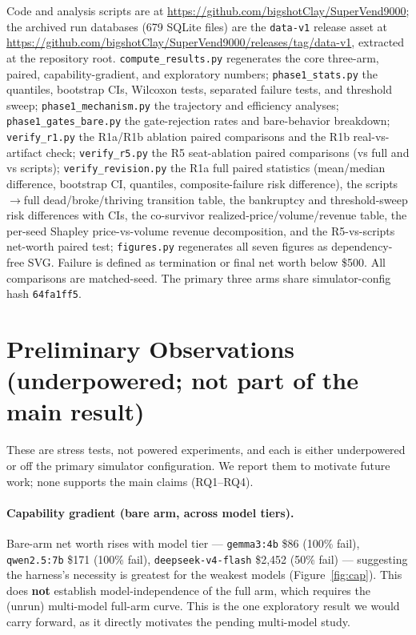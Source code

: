 \documentclass[11pt]{article}
\begin{document}
Code and analysis scripts are at
\url{https://github.com/bigshotClay/SuperVend9000}; the archived run databases
(679 SQLite files) are the \texttt{data-v1} release asset at
\url{https://github.com/bigshotClay/SuperVend9000/releases/tag/data-v1},
extracted at the repository root. \texttt{compute\_results.py} regenerates the core
three-arm, paired, capability-gradient, and exploratory numbers;
\texttt{phase1\_stats.py} the quantiles, bootstrap CIs, Wilcoxon tests,
separated failure tests, and threshold sweep; \texttt{phase1\_mechanism.py} the
trajectory and efficiency analyses; \texttt{phase1\_gates\_bare.py} the
gate-rejection rates and bare-behavior breakdown; \texttt{verify\_r1.py} the
R1a/R1b ablation paired comparisons and the R1b real-vs-artifact check;
\texttt{verify\_r5.py} the R5 seat-ablation paired comparisons (vs full and vs
scripts); \texttt{verify\_revision.py} the R1a full paired statistics
(mean/median difference, bootstrap CI, quantiles, composite-failure risk
difference), the scripts$\to$full dead/broke/thriving transition table, the
bankruptcy and threshold-sweep risk differences with CIs, the co-survivor
realized-price/volume/revenue table, the per-seed Shapley price-vs-volume
revenue decomposition, and the R5-vs-scripts net-worth paired test;
\texttt{figures.py} regenerates all seven figures as dependency-free SVG.
Failure is defined as termination or final net worth below \$500. All
comparisons are matched-seed. The primary three arms share simulator-config
hash \texttt{64fa1ff5}.

\section{Preliminary Observations (underpowered; not part of the main result)}

These are stress tests, not powered experiments, and each is either underpowered
or off the primary simulator configuration. We report them to motivate future
work; none supports the main claims (RQ1--RQ4).

\paragraph{Capability gradient (bare arm, across model tiers).} Bare-arm net
worth rises with model tier --- \texttt{gemma3:4b} \$86 (100\% fail),
\texttt{qwen2.5:7b} \$171 (100\% fail), \texttt{deepseek-v4-flash} \$2,452 (50\%
fail) --- suggesting the harness's necessity is greatest for the weakest models
(Figure~\ref{fig:cap}). This does \textbf{not} establish model-independence of
the full arm, which requires the (unrun) multi-model full-arm curve. This is the
one exploratory result we would carry forward, as it directly motivates the
pending multi-model study.
\end{document}

